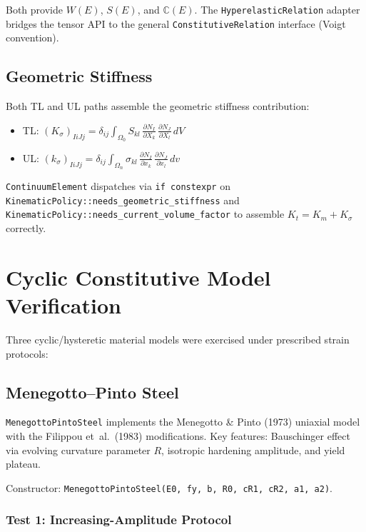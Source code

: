 Both provide $W(E)$, $S(E)$, and $\mathbb{C}(E)$.  The
\texttt{HyperelasticRelation} adapter bridges the tensor API to the
general \texttt{ConstitutiveRelation} interface (Voigt convention).

\subsection{Geometric Stiffness}

Both TL and UL paths assemble the geometric stiffness contribution:

\begin{itemize}
  \item TL: $(K_\sigma)_{IiJj} = \delta_{ij}\int_{\Omega_0} S_{kl}\,
        \frac{\partial N_I}{\partial X_k}\,
        \frac{\partial N_J}{\partial X_l}\,dV$
  \item UL: $(k_\sigma)_{IiJj} = \delta_{ij}\int_{\Omega_n} \sigma_{kl}\,
        \frac{\partial N_I}{\partial x_k}\,
        \frac{\partial N_J}{\partial x_l}\,dv$
\end{itemize}

\texttt{ContinuumElement} dispatches via \texttt{if constexpr} on
\texttt{KinematicPolicy::needs\_geometric\_stiffness} and
\texttt{KinematicPolicy::needs\_current\_volume\_factor} to assemble
$K_t = K_m + K_\sigma$ correctly.


\section{Cyclic Constitutive Model Verification}
\label{sec:phase4-hysteretic-cycling}

Three cyclic/hysteretic material models were exercised under prescribed
strain protocols:

\subsection{Menegotto--Pinto Steel}

\texttt{MenegottoPintoSteel} implements the Menegotto \& Pinto (1973)
uniaxial model with the Filippou et~al.\ (1983) modifications.
Key features: Bauschinger effect via evolving curvature parameter $R$,
isotropic hardening amplitude, and yield plateau.

\noindent
Constructor: \texttt{MenegottoPintoSteel(E0, fy, b, R0, cR1, cR2, a1, a2)}.

\subsubsection*{Test 1: Increasing-Amplitude Protocol}

